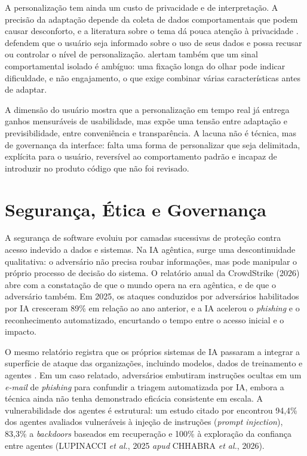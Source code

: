 A personalização tem ainda um custo de privacidade e de interpretação. A precisão da adaptação depende da coleta de dados comportamentais que podem causar desconforto, e a literatura sobre o tema dá pouca atenção à privacidade \cite{tan2025alp}.  defendem que o usuário seja informado sobre o uso de seus dados e possa recusar ou controlar o nível de personalização.  alertam também que um sinal comportamental isolado é ambíguo: uma fixação longa do olhar pode indicar dificuldade, e não engajamento, o que exige combinar várias características antes de adaptar.

A dimensão do usuário mostra que a personalização em tempo real já entrega ganhos mensuráveis de usabilidade, mas expõe uma tensão entre adaptação e previsibilidade, entre conveniência e transparência. A lacuna não é técnica, mas de governança da interface: falta uma forma de personalizar que seja delimitada, explícita para o usuário, reversível ao comportamento padrão e incapaz de introduzir no produto código que não foi revisado.

\section{Segurança, Ética e Governança}\label{sec:2.4}

A segurança de software evoluiu por camadas sucessivas de proteção contra acesso indevido a dados e sistemas. Na IA agêntica, surge uma descontinuidade qualitativa: o adversário não precisa roubar informações, mas pode manipular o próprio processo de decisão do sistema. O relatório anual da CrowdStrike (2026)\nocite{crowdstrike2026threat} abre com a constatação de que o mundo opera na era agêntica, e de que o adversário também. Em 2025, os ataques conduzidos por adversários habilitados por IA cresceram 89\% em relação ao ano anterior, e a IA acelerou o \textit{phishing} e o reconhecimento automatizado, encurtando o tempo entre o acesso inicial e o impacto.

O mesmo relatório registra que os próprios sistemas de IA passaram a integrar a superfície de ataque das organizações, incluindo modelos, dados de treinamento e agentes \cite{crowdstrike2026threat}. Em um caso relatado, adversários embutiram instruções ocultas em um \textit{e-mail} de \textit{phishing} para confundir a triagem automatizada por IA, embora a técnica ainda não tenha demonstrado eficácia consistente em escala. A vulnerabilidade dos agentes é estrutural: um estudo citado por  encontrou 94,4\% dos agentes avaliados vulneráveis à injeção de instruções (\textit{prompt injection}), 83,3\% a \textit{backdoors} baseados em recuperação e 100\% à exploração da confiança entre agentes (LUPINACCI \textit{et al.}, 2025 \textit{apud} CHHABRA \textit{et al.}, 2026)\nocite{chhabra2026security}.

